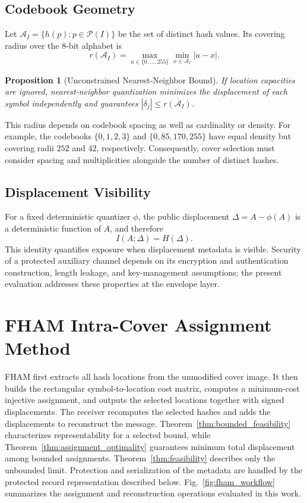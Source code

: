 \documentclass[preprint,12pt]{elsarticle}
\theoremstyle{plain}
\newtheorem{proposition}{Proposition}
\begin{document}
\subsection{Codebook Geometry}

Let $\mathcal{A}_I=\{h(p):p\in\mathcal{P}(I)\}$ be the set of distinct hash
values. Its covering radius over the 8-bit alphabet is
\begin{equation}
    r(\mathcal{A}_I)=
    \max_{a\in\{0,\ldots,255\}}\min_{x\in\mathcal{A}_I}|a-x|.
\end{equation}

\begin{proposition}[Unconstrained Nearest-Neighbor Bound]
If location capacities are ignored, nearest-neighbor quantization minimizes
the displacement of each symbol independently and guarantees
$|\delta_j|\leq r(\mathcal{A}_I)$.
\end{proposition}

This radius depends on codebook spacing as well as cardinality or density. For example,
the codebooks $\{0,1,2,3\}$ and $\{0,85,170,255\}$ have equal density but
covering radii $252$ and $42$, respectively. Consequently, cover selection
must consider spacing and multiplicities alongside the number of distinct
hashes.

\subsection{Displacement Visibility}

For a fixed deterministic quantizer $\phi$, the public displacement
$\Delta=A-\phi(A)$ is a deterministic function of $A$, and therefore
\begin{equation}
    I(A;\Delta)=H(\Delta).
\end{equation}
This identity quantifies exposure when displacement metadata is visible.
Security of a protected auxiliary channel depends on its encryption and
authentication construction, length leakage, and key-management assumptions;
the present evaluation addresses these properties at the envelope layer.

\section{FHAM Intra-Cover Assignment Method}
\label{sec:methodology}
FHAM first extracts all hash locations from the unmodified cover image. It then
builds the rectangular symbol-to-location cost matrix, computes a minimum-cost
injective assignment, and outputs the selected locations together with signed
displacements. The receiver recomputes the selected hashes and adds the
displacements to reconstruct the message. Theorem~\ref{thm:bounded_feasibility}
characterizes representability for a selected bound, while
Theorem~\ref{thm:assignment_optimality} guarantees minimum total displacement
among bounded assignments. Theorem~\ref{thm:feasibility} describes only the
unbounded limit. Protection and serialization of the metadata are handled by
the protected record representation described below.
Fig.~\ref{fig:fham_workflow} summarizes the assignment and reconstruction
operations evaluated in this work.
\end{document}
